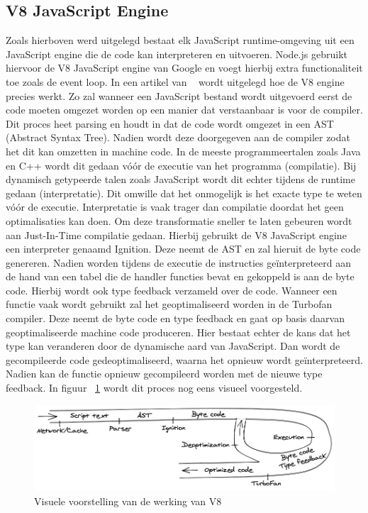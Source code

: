 \subsection{V8 JavaScript Engine}
Zoals hierboven werd uitgelegd bestaat elk JavaScript runtime-omgeving uit een JavaScript engine die de code kan interpreteren en uitvoeren.
Node.js gebruikt hiervoor de V8 JavaScript engine van Google en voegt hierbij extra functionaliteit toe zoals de event loop.
In een artikel van ~\textcite{Lyamkin2020} wordt uitgelegd hoe de V8 engine precies werkt. 
Zo zal wanneer een JavaScript bestand wordt uitgevoerd eerst de code moeten omgezet worden op een manier dat verstaanbaar is voor de compiler.
Dit proces heet parsing en houdt in dat de code wordt omgezet in een AST (Abstract Syntax Tree). 
Nadien wordt deze doorgegeven aan de compiler zodat het dit kan omzetten in machine code. 
In de meeste programmeertalen zoals Java en C++ wordt dit gedaan vóór de executie van het programma (compilatie).
Bij dynamisch getypeerde talen zoals JavaScript wordt dit echter tijdens de runtime gedaan (interpretatie). 
Dit omwille dat het onmogelijk is het exacte type te weten vóór de executie.
Interpretatie is vaak trager dan compilatie doordat het geen optimalisaties kan doen.
Om deze transformatie sneller te laten gebeuren wordt aan Just-In-Time compilatie gedaan.
Hierbij gebruikt de V8 JavaScript engine een interpreter genaamd Ignition. Deze neemt de AST en zal hieruit de byte code genereren.
Nadien worden tijdens de executie de instructies geïnterpreteerd aan de hand van een tabel die de handler functies bevat en gekoppeld 
is aan de byte code.
Hierbij wordt ook type feedback verzameld over de code. 
Wanneer een functie vaak wordt gebruikt zal het geoptimaliseerd worden in de Turbofan compiler.
Deze neemt de byte code en type feedback en gaat op basis daarvan geoptimaliseerde machine code produceren.
Hier bestaat echter de kans dat het type kan veranderen door de dynamische aard van JavaScript. 
Dan wordt de gecompileerde code gedeoptimaliseerd, waarna het opnieuw wordt geïnterpreteerd.
Nadien kan de functie opnieuw gecompileerd worden met de nieuwe type feedback.
In figuur ~\ref{fig:v8} wordt dit proces nog eens visueel voorgesteld.
\begin{figure}[h]
    \centering
    \includegraphics[width=.9\textwidth]{graphics/v8.png}
    \caption{\label{fig:v8}Visuele voorstelling van de werking van V8 ~\autocite{Lyamkin2020}}
\end{figure}

